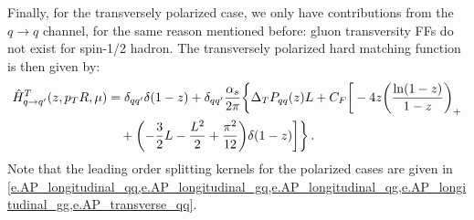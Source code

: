 \documentclass[a4paper, 11 pt]{article}
\begin{document}
Finally, for the transversely polarized case, we only have contributions from the $q \to q$ channel, for the same reason mentioned before: gluon transversity FFs do not exist for spin-1/2 hadron.
The transversely polarized hard matching function is then given by:
\begin{align}
    \hat{H}^T_{q \to q'} (z, p_TR, \mu)
& =
\delta _{qq'} \delta(1-z)
+ \delta _{qq'} \frac{\alpha _s}{2 \pi} \bigg\{\Delta _T P_{qq}(z) L + C_F \bigg[-4 z \pqty{\frac{\ln(1-z)}{1-z}}_+
\nonumber \\
& \quad +
\pqty{-\frac{3}{2} L - \frac{L^2}{2} + \frac{\pi ^2}{12}} \delta (1-z) \bigg] \bigg\}
\, .
\end{align}
Note that the leading order splitting kernels for the polarized cases are given in \cref{e.AP_longitudinal_qq,e.AP_longitudinal_gq,e.AP_longitudinal_qg,e.AP_longitudinal_gg,e.AP_transverse_qq}.
\end{document}
